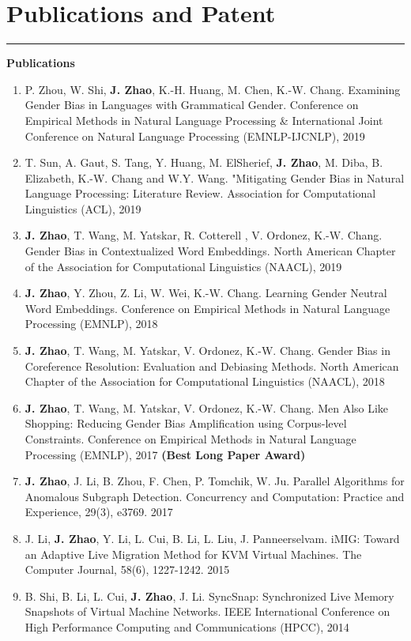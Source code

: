 \documentclass[11pt, a4paper]{article}
\newcommand{\hr}{\hrule\vspace{0.5em}}
\begin{document}
\section*{Publications and Patent}
\hr
\hspace{0.32in}\textbf{Publications}
\begin{enumerate}
	\item P. Zhou, W. Shi, \textbf{J. Zhao}, K.-H. Huang, M. Chen, K.-W. Chang. Examining Gender Bias in Languages with Grammatical Gender. Conference on Empirical Methods in Natural Language Processing \& International Joint Conference on Natural Language Processing (EMNLP-IJCNLP), 2019
	\item T. Sun, A. Gaut, S. Tang, Y. Huang, M. ElSherief, \textbf{J. Zhao}, M. Diba, B. Elizabeth, K.-W. Chang and W.Y. Wang. "Mitigating Gender Bias in Natural Language Processing: Literature Review. Association for Computational Linguistics (ACL), 2019
	\item \textbf{J. Zhao}, T. Wang, M. Yatskar, R. Cotterell , V. Ordonez, K.-W. Chang. Gender Bias in Contextualized Word Embeddings. North American Chapter of the Association for Computational Linguistics (NAACL), 2019
	\item \textbf{J. Zhao}, Y. Zhou, Z. Li, W. Wei, K.-W. Chang. Learning Gender Neutral Word Embeddings. Conference on Empirical Methods in Natural Language Processing (EMNLP), 2018
	\item \textbf{J. Zhao}, T. Wang, M. Yatskar, V. Ordonez, K.-W. Chang. Gender Bias in Coreference Resolution: Evaluation and Debiasing Methods. North American Chapter of the Association for Computational Linguistics (NAACL), 2018
	\item \textbf{J. Zhao}, T. Wang, M. Yatskar, V. Ordonez, K.-W. Chang. Men Also Like Shopping: Reducing Gender Bias Amplification using Corpus-level Constraints. Conference on Empirical Methods in Natural Language Processing (EMNLP), 2017 {\color{red}\textbf{(Best Long Paper Award)}}
	\item \textbf{J. Zhao}, J. Li, B. Zhou, F. Chen, P. Tomchik, W. Ju. Parallel Algorithms for Anomalous Subgraph Detection. Concurrency and Computation: Practice and Experience, 29(3), e3769. 2017
	\item J. Li, \textbf{J. Zhao}, Y. Li, L. Cui, B. Li, L. Liu, J. Panneerselvam. iMIG: Toward an Adaptive Live Migration Method for KVM Virtual Machines. The Computer Journal, 58(6), 1227-1242. 2015
	\item B. Shi, B. Li, L. Cui, \textbf{J. Zhao}, J. Li. SyncSnap: Synchronized Live Memory Snapshots of Virtual Machine Networks. IEEE International Conference on High Performance Computing and Communications (HPCC), 2014
\end{enumerate}
\end{document}
